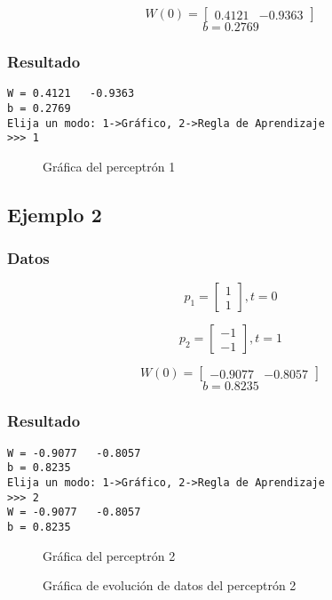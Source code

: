 \documentclass{article}
\begin{document}
\[W(0)= 
\begin{bmatrix}
 0.4121  & -0.9363
\end{bmatrix}
\]
$$ b= 0.2769 $$
\subsubsection{Resultado}
\begin{lstlisting}
W = 0.4121   -0.9363
b = 0.2769
Elija un modo: 1->Gráfico, 2->Regla de Aprendizaje
>>> 1
\end{lstlisting}
\begin{figure}[htpb]
	\centering
	
	\caption{Gráfica del perceptrón 1}
\end{figure}
\newpage
\subsection{Ejemplo 2}
\subsubsection{Datos}
\[p_1=
\begin{bmatrix}
1\\
1
\end{bmatrix}
, t=0
\]

\[p_2=
\begin{bmatrix}
-1\\
-1
\end{bmatrix}
, t=1
\]

\[W(0)= 
\begin{bmatrix}
 -0.9077  &  -0.8057
\end{bmatrix}
\]
$$ b= 0.8235 $$
\subsubsection{Resultado}
\begin{lstlisting}
W = -0.9077   -0.8057
b = 0.8235
Elija un modo: 1->Gráfico, 2->Regla de Aprendizaje
>>> 2
W = -0.9077   -0.8057
b = 0.8235
\end{lstlisting}
\begin{figure}[htpb]
	\centering
	
	\caption{Gráfica del perceptrón 2}
\end{figure}
\begin{figure}[htpb]
	\centering
	
	\caption{Gráfica de evolución de datos del perceptrón 2}
\end{figure}
\newpage
\end{document}
